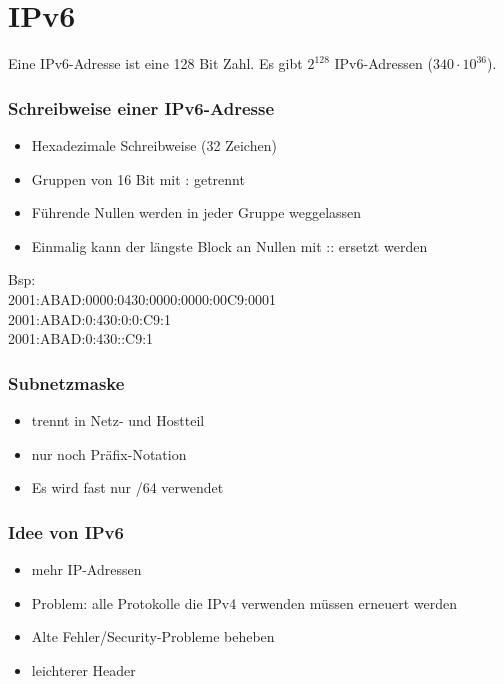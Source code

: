 \chapter{IPv6}
Eine IPv6-Adresse ist eine 128 Bit Zahl. Es gibt $2^{128}$ IPv6-Adressen ($340\cdot10^{36}$).

\subsection*{Schreibweise einer IPv6-Adresse}
\begin{itemize}
	\item Hexadezimale Schreibweise (32 Zeichen)
	\item Gruppen von 16 Bit mit : getrennt
	\item Führende Nullen werden in jeder Gruppe weggelassen
	\item Einmalig kann der längste Block an Nullen mit :: ersetzt werden
\end{itemize}

Bsp: \\
2001:ABAD:0000:0430:0000:0000:00C9:0001 \\
2001:ABAD:0:430:0:0:C9:1 \\
2001:ABAD:0:430::C9:1

\subsection*{Subnetzmaske}
\begin{itemize}
	\item trennt in Netz- und Hostteil 
	\item nur noch Präfix-Notation
	\item Es wird fast nur /64 verwendet
\end{itemize}

\subsection*{Idee von IPv6}
\begin{itemize}
	\item mehr IP-Adressen
	\item Problem: alle Protokolle die IPv4 verwenden müssen erneuert werden
	\item Alte Fehler/Security-Probleme beheben
	\item leichterer Header
\end{itemize}

